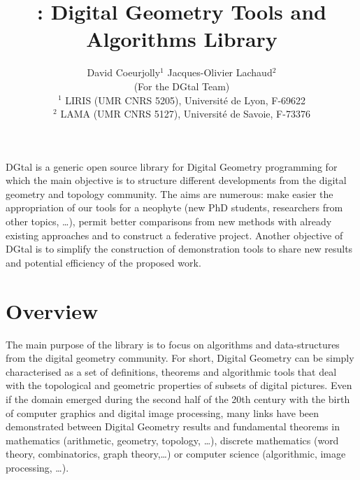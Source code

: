 \documentclass[11pt, a4paper]{article}
\date{}
\title{\DGtal: Digital Geometry Tools and Algorithms Library}
\author{David Coeurjolly$^1$ \qquad \qquad Jacques-Olivier Lachaud$^2$ \\
  (For the DGtal Team)\\
${}^1$ LIRIS (UMR CNRS 5205), Universit\'{e} de Lyon, F-69622 \\
${}^2$ LAMA (UMR CNRS 5127), Universit\'{e} de Savoie, F-73376\\
}
\begin{document}
\maketitle

DGtal is a generic open source library for Digital Geometry
programming for which the main objective is to structure different
developments from the digital geometry and topology community. The
aims are numerous: make easier the appropriation of our tools for a
neophyte (new PhD students, researchers from other topics, …), permit
better comparisons from new methods with already existing approaches
and to construct a federative project. Another objective of DGtal is
to simplify the construction of demonstration tools to share new
results and potential efficiency of the proposed work.

\section*{Overview}

The main purpose of the library is to focus on algorithms and
data-structures from the digital geometry community. For short,
Digital Geometry can be simply characterised as a set of definitions,
theorems and algorithmic tools that deal with the topological and
geometric properties of subsets of digital pictures. Even if the
domain emerged during the second half of the 20th century with the
birth of computer graphics and digital image processing, many links
have been demonstrated between Digital Geometry results and
fundamental theorems in mathematics (arithmetic, geometry, topology,
\ldots), discrete mathematics (word theory, combinatorics, graph
theory,\ldots) or computer science (algorithmic, image processing,
\ldots).
\end{document}
